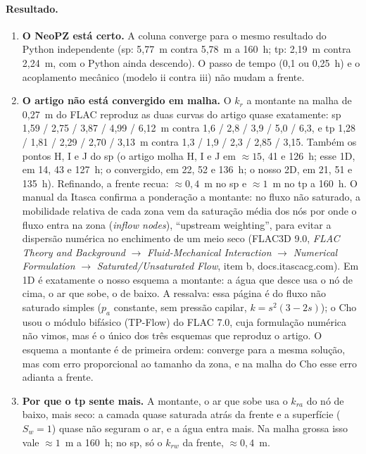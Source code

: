 \documentclass[11pt,a4paper]{article}
\begin{document}
\paragraph{Resultado.}
\begin{enumerate}
  \item \textbf{O NeoPZ está certo.} A coluna converge para o mesmo resultado do Python independente (sp: 5,77~m
    contra 5,78~m a 160~h; tp: 2,19~m contra 2,24~m, com o Python ainda descendo). O passo de tempo (0,1 ou
    0,25~h) e o acoplamento mecânico (modelo ii contra iii) não mudam a frente.
  \item \textbf{O artigo não está convergido em malha.} O $k_r$ a montante na malha de 0,27~m do FLAC reproduz as duas
    curvas do artigo quase exatamente: sp 1,59 / 2,75 / 3,87 / 4,99 / 6,12~m contra 1,6 / 2,8 / 3,9 / 5,0 / 6,3, e
    tp 1,28 / 1,81 / 2,29 / 2,70 / 3,13~m contra 1,3 / 1,9 / 2,3 / 2,85 / 3,15. Também os pontos H, I e J do sp (o
    artigo molha H, I e J em $\approx 15$, 41 e 126~h; esse 1D, em 14, 43 e 127~h; o convergido, em 22, 52 e 136~h;
    o nosso 2D, em 21, 51 e 135~h). Refinando, a frente recua: $\approx 0{,}4$~m no sp e $\approx 1$~m no tp a
    160~h. O manual da Itasca confirma a ponderação a montante: no fluxo não saturado, a mobilidade
    relativa de cada zona vem da saturação média dos nós por onde o fluxo entra na zona (\emph{inflow nodes}),
    ``upstream weighting'', para evitar a dispersão numérica no enchimento de um meio seco (FLAC3D 9.0,
    \emph{FLAC Theory and Background} $\to$ \emph{Fluid-Mechanical Interaction} $\to$ \emph{Numerical
    Formulation} $\to$ \emph{Saturated/Unsaturated Flow}, item b, docs.itascacg.com). Em 1D é exatamente o nosso
    esquema a montante: a água que desce usa o nó de cima, o ar que sobe, o de baixo. A ressalva: essa página é do
    fluxo não saturado simples ($p_a$ constante, sem pressão capilar, $k = s^2(3 - 2s)$); o Cho usou o módulo
    bifásico (TP-Flow) do FLAC 7.0, cuja formulação numérica não vimos, mas é o único dos três esquemas que
    reproduz o artigo. O esquema a montante é de primeira ordem: converge para a mesma solução, mas com erro
    proporcional ao tamanho da zona, e na malha do Cho esse erro adianta a frente.
  \item \textbf{Por que o tp sente mais.} A montante, o ar que sobe usa o $k_{ra}$ do nó de baixo, mais seco: a camada
    quase saturada atrás da frente e a superfície ($S_w = 1$) quase não seguram o ar, e a água entra mais. Na malha
    grossa isso vale $\approx 1$~m a 160~h; no sp, só o $k_{rw}$ da frente, $\approx 0{,}4$~m.

\end{enumerate}
\end{document}
